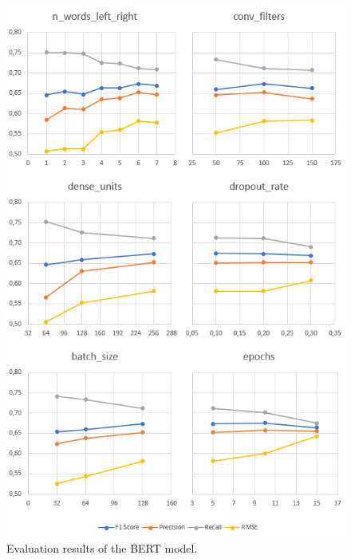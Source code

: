 \documentclass[11pt,a4paper]{article}
\begin{document}
\begin{figure}[h!]
\centering
\includegraphics[width=1.0\columnwidth]{bert-model-results.png}
\caption{Evaluation results of the BERT model.}
\label{fig:bert-model-results}
\end{figure}
\end{document}
